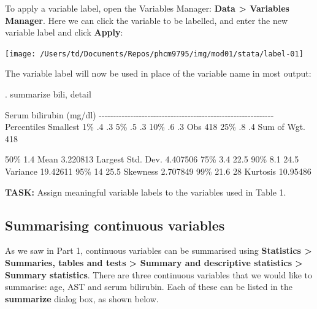 \documentclass[
]{memoir}
\newenvironment{Shaded}{\begin{snugshade}}{\end{snugshade}}
\newcommand{\NormalTok}[1]{#1}
\begin{document}
To apply a variable label, open the Variables Manager: \textbf{Data \textgreater{} Variables Manager}. Here we can click the variable to be labelled, and enter the new variable label and click \textbf{Apply}:

\texttt{[image: /Users/td/Documents/Repos/phcm9795/img/mod01/stata/label-01]}

The variable label will now be used in place of the variable name in most output:

\begin{Shaded}
\begin{Highlighting}[]
\NormalTok{. summarize bili, detail}

\NormalTok{                   Serum bilirubin (mg/dl)}
\NormalTok{{-}{-}{-}{-}{-}{-}{-}{-}{-}{-}{-}{-}{-}{-}{-}{-}{-}{-}{-}{-}{-}{-}{-}{-}{-}{-}{-}{-}{-}{-}{-}{-}{-}{-}{-}{-}{-}{-}{-}{-}{-}{-}{-}{-}{-}{-}{-}{-}{-}{-}{-}{-}{-}{-}{-}{-}{-}{-}{-}{-}{-}}
\NormalTok{      Percentiles      Smallest}
\NormalTok{ 1\%           .4             .3}
\NormalTok{ 5\%           .5             .3}
\NormalTok{10\%           .6             .3       Obs                 418}
\NormalTok{25\%           .8             .4       Sum of Wgt.         418}

\NormalTok{50\%          1.4                      Mean           3.220813}
\NormalTok{                        Largest       Std. Dev.      4.407506}
\NormalTok{75\%          3.4           22.5}
\NormalTok{90\%          8.1           24.5       Variance       19.42611}
\NormalTok{95\%           14           25.5       Skewness       2.707849}
\NormalTok{99\%         21.6             28       Kurtosis       10.95486}
\end{Highlighting}
\end{Shaded}

\textbf{TASK:} Assign meaningful variable labels to the variables used in Table 1.

\hypertarget{summarising-continuous-variables}{%
\subsection{Summarising continuous variables}\label{summarising-continuous-variables}}

As we saw in Part 1, continuous variables can be summarised using \textbf{Statistics \textgreater{} Summaries, tables and tests \textgreater{} Summary and descriptive statistics \textgreater{} Summary statistics}. There are three continuous variables that we would like to summarise: age, AST and serum bilirubin. Each of these can be listed in the \textbf{summarize} dialog box, as shown below.
\end{document}
